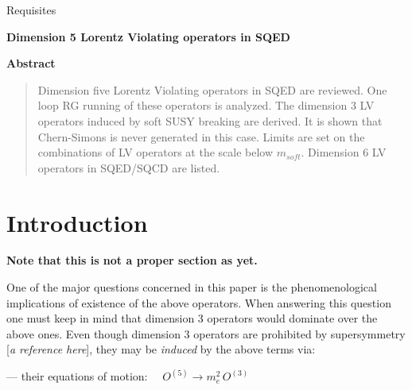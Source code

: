 \documentclass[a4paper,12pt]{article}
\begin{document}
\begin{titlepage}
\renewcommand{\thefootnote}{\fnsymbol{footnote}}


\begin{flushright}
Requisites
\end{flushright}


\vfil

\begin{center}
\baselineskip20pt
{\bf \LARGE Dimension 5 Lorentz Violating operators in SQED}
\end{center}
\bigskip


\begin{center}
{\large\bf Abstract} \vspace*{.2cm}
\end{center}

\begin{quotation}
	Dimension five Lorentz Violating operators in SQED are reviewed.
	One loop RG running of these operators is analyzed. 
	The dimension 3 LV operators induced by soft SUSY breaking 
	are derived. 
	It is shown that Chern-Simons is never generated in this case. 
	Limits are set on the combinations of LV operators at the scale 
	below $ m_{soft} $.
	Dimension 6 LV operators in SQED/SQCD are listed.
\end{quotation}



\vfil
\end{titlepage}


\newpage

\setcounter{footnote}{0}
\setcounter{equation}{0}


\section{Introduction}
\label{Intro}
	{\bf Note that this is not a proper section as yet.}

	One of the major questions concerned in this paper is the
	phenomenological implications of existence of the above
	operators. 
	When answering this question one must keep in mind that
	dimension 3 operators would dominate over the above ones.
	Even though dimension 3 operators are prohibited by
	supersymmetry [{\it a reference here}], they may be 
	{\it induced} by the above terms via:

	--- their equations of motion: 
	      ~~$ O^{(5)} \to m_e^2\, O^{(3)} $
\end{document}
